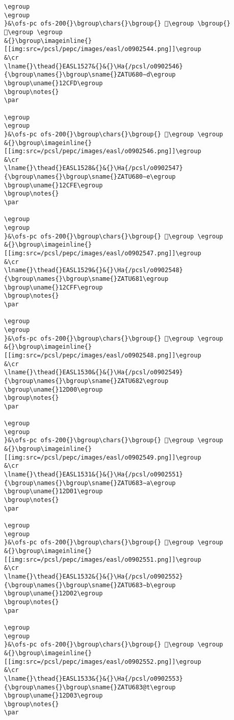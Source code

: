 \begin{verbatim}
\egroup
\egroup
}&\ofs-pc ofs-200{}\bgroup\chars{}\bgroup{} 𒳻\egroup \bgroup{} 𒳼\egroup \egroup
&{}\bgroup\imageinline{}[[img:src=/pcsl/pepc/images/easl/o0902544.png]]\egroup
&\cr
\lname{}\thead{}EASL1527&{}&{}\Ha{/pcsl/o0902546}{\bgroup\names{}\bgroup\sname{}ZATU680∼d\egroup
\bgroup\uname{}12CFD\egroup
\bgroup\notes{}
\par 

\egroup
\egroup
}&\ofs-pc ofs-200{}\bgroup\chars{}\bgroup{} 𒳽\egroup \egroup
&{}\bgroup\imageinline{}[[img:src=/pcsl/pepc/images/easl/o0902546.png]]\egroup
&\cr
\lname{}\thead{}EASL1528&{}&{}\Ha{/pcsl/o0902547}{\bgroup\names{}\bgroup\sname{}ZATU680∼e\egroup
\bgroup\uname{}12CFE\egroup
\bgroup\notes{}
\par 

\egroup
\egroup
}&\ofs-pc ofs-200{}\bgroup\chars{}\bgroup{} 𒳾\egroup \egroup
&{}\bgroup\imageinline{}[[img:src=/pcsl/pepc/images/easl/o0902547.png]]\egroup
&\cr
\lname{}\thead{}EASL1529&{}&{}\Ha{/pcsl/o0902548}{\bgroup\names{}\bgroup\sname{}ZATU681\egroup
\bgroup\uname{}12CFF\egroup
\bgroup\notes{}
\par 

\egroup
\egroup
}&\ofs-pc ofs-200{}\bgroup\chars{}\bgroup{} 𒳿\egroup \egroup
&{}\bgroup\imageinline{}[[img:src=/pcsl/pepc/images/easl/o0902548.png]]\egroup
&\cr
\lname{}\thead{}EASL1530&{}&{}\Ha{/pcsl/o0902549}{\bgroup\names{}\bgroup\sname{}ZATU682\egroup
\bgroup\uname{}12D00\egroup
\bgroup\notes{}
\par 

\egroup
\egroup
}&\ofs-pc ofs-200{}\bgroup\chars{}\bgroup{} 𒴀\egroup \egroup
&{}\bgroup\imageinline{}[[img:src=/pcsl/pepc/images/easl/o0902549.png]]\egroup
&\cr
\lname{}\thead{}EASL1531&{}&{}\Ha{/pcsl/o0902551}{\bgroup\names{}\bgroup\sname{}ZATU683∼a\egroup
\bgroup\uname{}12D01\egroup
\bgroup\notes{}
\par 

\egroup
\egroup
}&\ofs-pc ofs-200{}\bgroup\chars{}\bgroup{} 𒴁\egroup \egroup
&{}\bgroup\imageinline{}[[img:src=/pcsl/pepc/images/easl/o0902551.png]]\egroup
&\cr
\lname{}\thead{}EASL1532&{}&{}\Ha{/pcsl/o0902552}{\bgroup\names{}\bgroup\sname{}ZATU683∼b\egroup
\bgroup\uname{}12D02\egroup
\bgroup\notes{}
\par 

\egroup
\egroup
}&\ofs-pc ofs-200{}\bgroup\chars{}\bgroup{} 𒴂\egroup \egroup
&{}\bgroup\imageinline{}[[img:src=/pcsl/pepc/images/easl/o0902552.png]]\egroup
&\cr
\lname{}\thead{}EASL1533&{}&{}\Ha{/pcsl/o0902553}{\bgroup\names{}\bgroup\sname{}ZATU683@t\egroup
\bgroup\uname{}12D03\egroup
\bgroup\notes{}
\par 


\end{verbatim}
